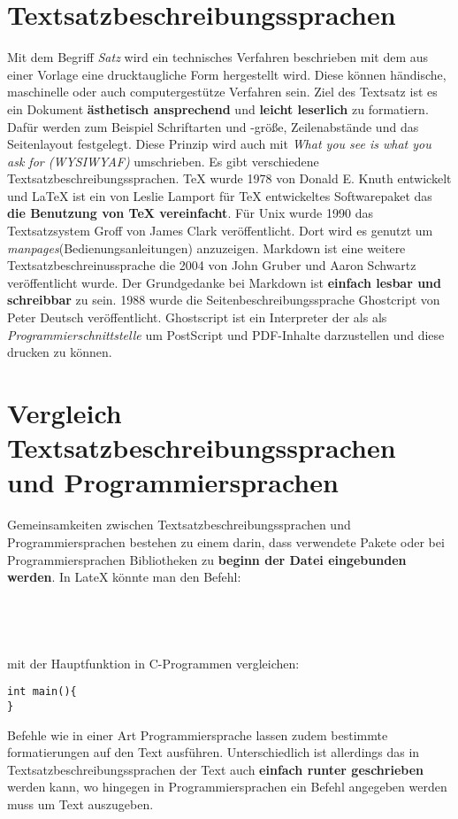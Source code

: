 \section{Textsatzbeschreibungssprachen}
Mit dem Begriff \textit{Satz} wird ein technisches Verfahren beschrieben mit dem aus einer Vorlage eine drucktaugliche Form hergestellt wird. Diese können händische, maschinelle oder auch computergestütze Verfahren sein. Ziel des Textsatz ist es ein Dokument \textbf{ästhetisch ansprechend} und \textbf{leicht leserlich} zu formatiern. Dafür werden zum Beispiel Schriftarten und -größe, Zeilenabstände und das Seitenlayout festgelegt. Diese Prinzip wird auch mit \textit{What you see is what you ask for (WYSIWYAF)} umschrieben.
Es gibt verschiedene Textsatzbeschreibungssprachen. TeX wurde 1978 von Donald E. Knuth entwickelt und LaTeX ist ein von Leslie Lamport für TeX entwickeltes Softwarepaket das \textbf{die Benutzung von TeX vereinfacht}. Für Unix wurde 1990 das Textsatzsystem Groff von James Clark veröffentlicht. Dort wird es genutzt um \textit{manpages}(Bedienungsanleitungen) anzuzeigen. Markdown ist eine weitere Textsatzbeschreinussprache die 2004 von John Gruber und Aaron Schwartz veröffentlicht wurde. Der Grundgedanke bei Markdown ist \textbf{einfach lesbar und schreibbar} zu sein. 1988 wurde die Seitenbeschreibungssprache Ghostcript von Peter Deutsch veröffentlicht. Ghostscript ist ein Interpreter der als als \textit{Programmierschnittstelle} um PostScript und PDF-Inhalte darzustellen und diese drucken zu können. 

\section{Vergleich Textsatzbeschreibungssprachen und Programmiersprachen}
Gemeinsamkeiten zwischen Textsatzbeschreibungssprachen und Programmiersprachen bestehen zu einem darin, dass verwendete Pakete oder bei Programmiersprachen Bibliotheken zu \textbf{beginn der Datei eingebunden werden}. In LateX könnte man den Befehl:
\begin{verbatim}

 


\end{verbatim}
mit der Hauptfunktion in C-Programmen vergleichen:
\begin{verbatim}
int main(){
} 
\end{verbatim}
Befehle wie in einer Art Programmiersprache lassen zudem bestimmte formatierungen auf den Text ausführen.
Unterschiedlich ist allerdings das in Textsatzbeschreibungssprachen der Text auch \textbf{einfach runter geschrieben} werden kann, wo hingegen in Programmiersprachen ein Befehl angegeben werden muss um Text auszugeben.

